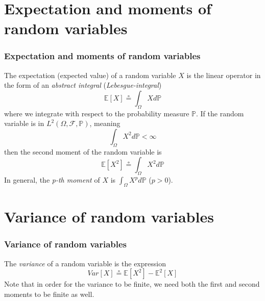 \documentclass[xcolor=dvipsnames]{beamer}
\begin{document}
\section{Expectation and moments of random variables}
\begin{frame}
\frametitle{Expectation and moments of random variables}
The expectation (expected value) of a random variable $X$ is the linear operator in the form of an \emph{abstract integral} (\emph{Lebesgue-integral})
\[
	\mathbb{E}[X] \circeq \int_{\Omega}{Xd\mathbb{P}}
\]
where we integrate with respect to the probability measure $\mathbb{P}$.
If the random variable is in $L^2(\Omega, \mathcal{F}, \mathbb{P})$, meaning
\[
	\int_{\Omega}{X^2d\mathbb{P}} < \infty
\]
then the second moment of the random variable is
\[
	\mathbb{E}[X^2] \circeq \int_{\Omega}{X^2d\mathbb{P}}
\]
In general, the \emph{p-th moment} of $X$ is $\int_{\Omega}{X^pd\mathbb{P}}$ ($p>0$).
\end{frame}
\section{Variance of random variables}
\begin{frame}
\frametitle{Variance of random variables}
The \emph{variance} of a random variable is the expression
\[
	Var[X] \circeq \mathbb{E}[X^2] - \mathbb{E}^2[X]
\]
Note that in order for the variance to be finite, we need both the first and second moments to be finite as well.
\end{frame}
\end{document}
